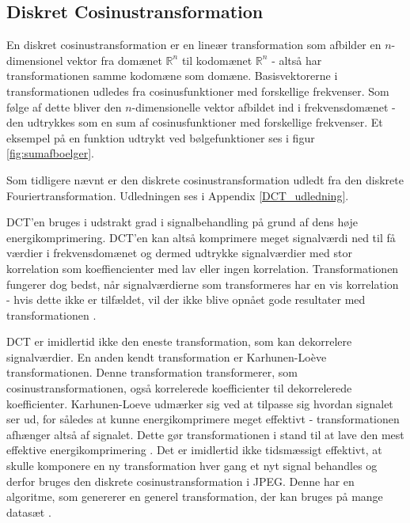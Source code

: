 \subsection{Diskret Cosinustransformation}\label{sec:DCT}
En diskret cosinustransformation er en lineær transformation som afbilder en $n$-dimensionel vektor fra domænet $\mathbb{R}^n$ til kodomænet $\mathbb{R}^n$ - altså har transformationen samme kodomæne som domæne. Basisvektorerne i transformationen udledes fra cosinusfunktioner med forskellige frekvenser. Som følge af dette bliver den $n$-dimensionelle vektor afbildet ind i frekvensdomænet - den udtrykkes som en sum af cosinusfunktioner med forskellige frekvenser. Et eksempel på en funktion udtrykt ved bølgefunktioner ses i figur \vref{fig:sumafboelger}.

Som tidligere nævnt er den diskrete cosinustransformation udledt fra den diskrete Fouriertransformation. Udledningen ses i Appendix \vref{DCT_udledning}.

DCT'en bruges i udstrakt grad i signalbehandling på grund af dens høje energikomprimering. DCT'en kan altså komprimere meget signalværdi ned til få værdier i frekvensdomænet og dermed udtrykke signalværdier med stor korrelation som koeffiencienter med lav eller ingen korrelation. Transformationen fungerer dog bedst, når signalværdierne som transformeres har en vis korrelation - hvis dette ikke er tilfældet, vil der ikke blive opnået gode resultater med transformationen \citep{smcnus_energy}.

DCT er imidlertid ikke den eneste transformation, som kan dekorrelere signalværdier. En anden kendt transformation er Karhunen-Loève transformationen. Denne transformation transformerer, som cosinustransformationen, også korrelerede koefficienter til dekorrelerede koefficienter. Karhunen-Loeve udmærker sig ved at tilpasse sig hvordan signalet ser ud, for således at kunne energikomprimere meget effektivt - transformationen afhænger altså af signalet. Dette gør transformationen i stand til at lave den mest effektive energikomprimering \citep{lokminglui_DCT}. Det er imidlertid ikke tidsmæssigt effektivt, at skulle komponere en ny transformation hver gang et nyt signal behandles og derfor bruges den diskrete cosinustransformation i JPEG. Denne har en algoritme, som genererer en generel transformation, der kan bruges på mange datasæt \citep{electronic_engineering}.

